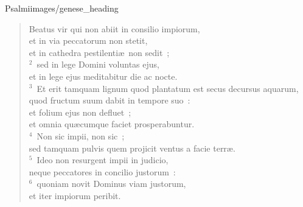 {Psalmi}{images/genese_heading}

\begin{flushleft}\begin{verse}\vspace{-11pt}Beatus vir qui non abiit in consilio impiorum,\\ et in via peccatorum non stetit,\\ et in cathedra pestilenti\ae\ non sedit~;\\
${}^{2}$~sed in lege Domini voluntas ejus,\\ et in lege ejus meditabitur die ac nocte.\\
${}^{3}$~Et erit tamquam lignum quod plantatum est secus decursus aquarum,\\ quod fructum suum dabit in tempore suo~:\\ et folium ejus non defluet~;\\ et omnia qu\ae cumque faciet prosperabuntur.\\
${}^{4}$~Non sic impii, non sic~;\\ sed tamquam pulvis quem projicit ventus a facie terr\ae .\\
${}^{5}$~Ideo non resurgent impii in judicio,\\ neque peccatores in concilio justorum~:\\
${}^{6}$~quoniam novit Dominus viam justorum,\\ et iter impiorum peribit.\end{verse}\end{flushleft}


